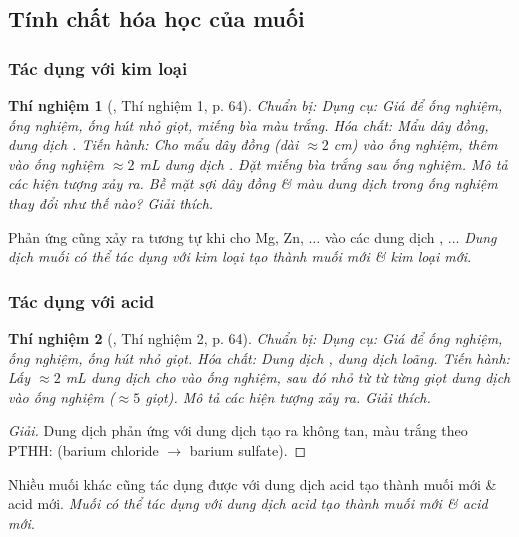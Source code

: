 \documentclass{article}
\newtheorem{thinghiem}{Thí nghiệm}
\begin{document}
\subsection{Tính chất hóa học của muối}

\subsubsection{Tác dụng với kim loại}

\begin{thinghiem}[\cite{SGK_KHTN_8_Canh_Dieu}, Thí nghiệm 1, p. 64]
	\emph{Chuẩn bị:} Dụng cụ: Giá để ống nghiệm, ống nghiệm, ống hút nhỏ giọt, miếng bìa màu trắng. Hóa chất: Mẩu dây đồng, dung dịch \emph{}. \emph{Tiến hành:} Cho mẩu dây đồng (dài $\approx2$ \emph{cm}) vào ống nghiệm, thêm vào ống nghiệm $\approx2$ \emph{mL} dung dịch \emph{}. Đặt miếng bìa trắng sau ống nghiệm. Mô tả các hiện tượng xảy ra. Bề mặt sợi dây đồng \& màu dung dịch trong ống nghiệm thay đổi như thế nào? Giải thích.
\end{thinghiem}
Phản ứng cũng xảy ra tương tự khi cho Mg, Zn, $\ldots$ vào các dung dịch , $\ldots$ \textit{Dung dịch muối có thể tác dụng với kim loại tạo thành muối mới \& kim loại mới}.

\subsubsection{Tác dụng với acid}

\begin{thinghiem}[\cite{SGK_KHTN_8_Canh_Dieu}, Thí nghiệm 2, p. 64]
	\emph{Chuẩn bị:} Dụng cụ: Giá để ống nghiệm, ống nghiệm, ống hút nhỏ giọt. Hóa chất: Dung dịch \emph{}, dung dịch \emph{} loãng. \emph{Tiến hành:} Lấy $\approx2$ \emph{mL} dung dịch \emph{} cho vào ống nghiệm, sau đó nhỏ từ từ từng giọt dung dịch \emph{} vào ống nghiệm ($\approx5$ giọt). Mô tả các hiện tượng xảy ra. Giải thích.
\end{thinghiem}

\begin{proof}[Giải]
	Dung dịch  phản ứng với dung dịch  tạo ra  không tan, màu trắng theo PTHH:  (barium chloride $\to$ barium sulfate).
\end{proof}
Nhiều muối khác cũng tác dụng được với dung dịch acid tạo thành muối mới \& acid mới. \textit{Muối có thể tác dụng với dung dịch acid tạo thành muối mới \& acid mới}.
\end{document}
